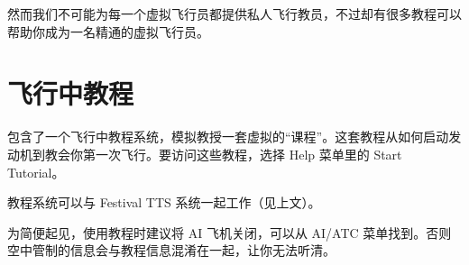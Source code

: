 然而我们不可能为每一个虚拟飞行员都提供私人飞行教员，不过却有很多教程可以帮助你成为一名精通的虚拟飞行员。
\fi
\iffalse
\IfLanguageName{english}{
If you are new to flying, an advanced simulator such as \FlightGear{} can seem
daunting: You are presented with a cockpit of an aircraft with little
information on how to fly it.

In real life, when learning to fly you would have an instructor sitting next to
you to teach you how to fly and keep you safe.

While we cannot provide a personal instructor for every virtual pilot, there are
a number of tutorials available that you can follow to become a proficient
virtual pilot.
}{}
\fi
{}

\ifchinese
\section{飞行中教程}
\fi
\iffalse
\IfLanguageName{english}{
\section{In-flight Tutorials}
}{}
\IfLanguageName{french}{
\section{Tutoriels en vol}
}{}
\fi

\ifchinese
\FlightGear{} 包含了一个飞行中教程系统，模拟教授一套虚拟的“课程”。这套教程从如何启动发动机到教会你第一次飞行。要访问这些教程，选择 Help 菜单里的 Start Tutorial。

教程系统可以与 Festival TTS 系统一起工作（见上文）。

为简便起见，使用教程时建议将 AI 飞机关闭，可以从 AI/ATC 菜单找到。否则空中管制的信息会与教程信息混淆在一起，让你无法听清。

